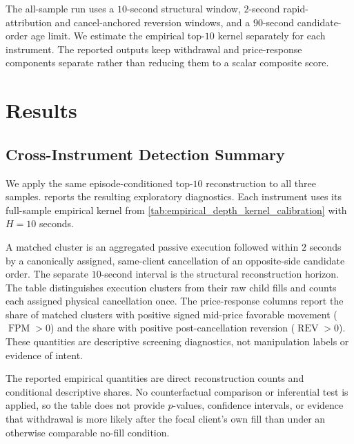 \documentclass[11pt]{article}
\begin{document}
The all-sample run uses a $10$-second structural window, $2$-second rapid-attribution and cancel-anchored reversion
windows, and a $90$-second candidate-order age limit. We estimate the empirical top-$10$ kernel separately for each
instrument. The reported outputs keep withdrawal and price-response components separate rather than reducing them to a
scalar composite score.

\section{Results}
\label{sec:results}

\subsection{Cross-Instrument Detection Summary}
\label{subsec:cross_instrument_results}

We apply the same episode-conditioned top-$10$ reconstruction to all three samples.
 reports the resulting exploratory diagnostics. Each instrument uses its
full-sample empirical kernel from \cref{tab:empirical_depth_kernel_calibration} with $H=10$ seconds.

A matched cluster is an aggregated passive execution followed within $2$ seconds by a canonically assigned, same-client
cancellation of an opposite-side candidate order. The separate $10$-second interval is the structural reconstruction
horizon. The table distinguishes execution clusters from their raw child fills and counts each assigned physical
cancellation once. The price-response columns report the share of matched clusters with positive signed mid-price
favorable movement ($\operatorname{FPM}>0$) and the share with positive post-cancellation reversion
($\operatorname{REV}>0$). These quantities are descriptive screening diagnostics, not manipulation labels or evidence of
intent.


The reported empirical quantities are direct reconstruction counts and conditional descriptive shares. No counterfactual
comparison or inferential test is applied, so the table does not provide $p$-values, confidence intervals, or evidence that
withdrawal is more likely after the focal client's own fill than under an otherwise comparable no-fill condition.
\end{document}
